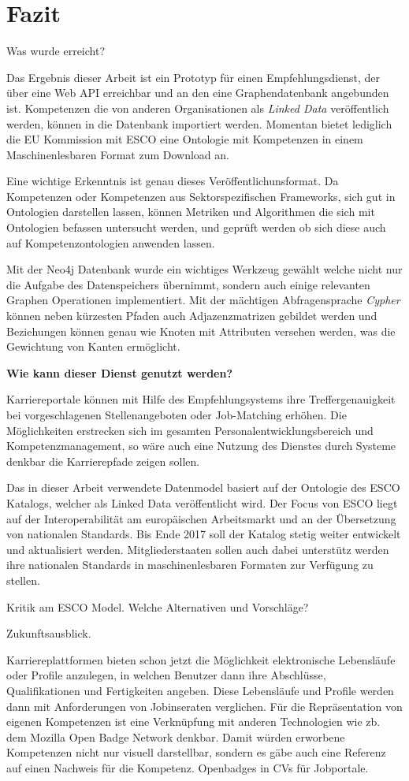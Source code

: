 \section{Fazit}\label{fazit}

Was wurde erreicht?

Das Ergebnis dieser Arbeit ist ein Prototyp für einen Empfehlungsdienst, der über eine Web API erreichbar und an den eine Graphendatenbank angebunden ist. Kompetenzen die von anderen Organisationen als \textit{Linked Data} veröffentlich werden, können in die Datenbank importiert werden. Momentan bietet lediglich die EU Kommission mit ESCO eine Ontologie mit Kompetenzen in einem Maschinenlesbaren Format zum Download an. 

Eine wichtige Erkenntnis ist genau dieses Veröffentlichunsformat. Da Kompetenzen oder Kompetenzen aus Sektorspezifischen Frameworks, sich gut in Ontologien darstellen lassen, können Metriken und Algorithmen die sich mit Ontologien befassen untersucht werden, und geprüft werden ob sich diese auch auf Kompetenzontologien anwenden lassen.

Mit der Neo4j Datenbank wurde ein wichtiges Werkzeug gewählt welche nicht nur die Aufgabe des Datenspeichers übernimmt, sondern auch einige relevanten Graphen Operationen implementiert. Mit der mächtigen Abfragensprache \textit{Cypher} können neben kürzesten Pfaden auch Adjazenzmatrizen gebildet werden und Beziehungen können genau wie Knoten mit Attributen versehen werden, was die Gewichtung von Kanten ermöglicht.

\textbf{Wie kann dieser Dienst genutzt werden? }

Karriereportale können mit Hilfe des Empfehlungsystems ihre Treffergenauigkeit bei vorgeschlagenen Stellenangeboten oder Job-Matching erhöhen. Die Möglichkeiten erstrecken sich im gesamten Personalentwicklungsbereich und Kompetenzmanagement, so wäre auch eine Nutzung des Dienstes durch Systeme denkbar die Karrierepfade zeigen sollen. 
 
Das in dieser Arbeit verwendete Datenmodel basiert auf der Ontologie des ESCO Katalogs, welcher als Linked Data veröffentlicht wird. Der Focus von ESCO liegt auf der Interoperabilität am europäischen Arbeitsmarkt und an der Übersetzung von nationalen Standards. Bis Ende 2017 soll der Katalog stetig weiter entwickelt und aktualisiert werden. Mitgliederstaaten sollen auch dabei unterstütz werden ihre nationalen Standards in maschinenlesbaren Formaten zur Verfügung zu stellen. 

Kritik 
  am ESCO Model. Welche Alternativen und Vorschläge?
  

Zukunftsausblick.

Karriereplattformen bieten schon jetzt die Möglichkeit elektronische Lebensläufe oder Profile anzulegen, in welchen Benutzer dann ihre Abschlüsse, Qualifikationen und Fertigkeiten angeben. Diese Lebensläufe und Profile werden dann mit Anforderungen von Jobinseraten verglichen. Für die Repräsentation von eigenen Kompetenzen ist eine Verknüpfung mit anderen Technologien wie zb. dem Mozilla Open Badge Network denkbar. Damit würden erworbene Kompetenzen nicht nur visuell darstellbar, sondern es gäbe auch eine Referenz auf einen Nachweis für die Kompetenz. 
Openbadges in CVs für Jobportale.

